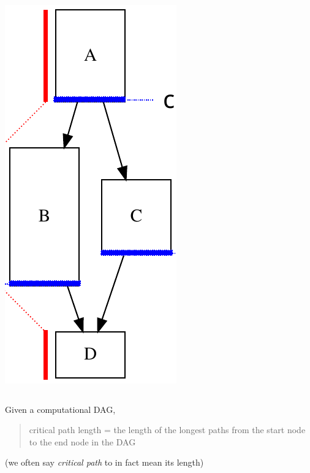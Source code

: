 \documentclass[12pt,dvipdfmx]{beamer}
\newcommand{\ao}[1]{{\color{blue}#1}}
\begin{document}
\begin{frame}[fragile]
\begin{columns}[t]
\begin{column}{0.35\textwidth}
\begin{center}
\includegraphics[width=\textwidth]{out/pdf/svg/dag_cp.pdf}
\end{center}
\end{column}
\end{columns}

Given a computational DAG,
\begin{quote}
\ao{critical path length 
  = the length of the longest 
  paths from the start node to the end node in the DAG}
\end{quote}

(we often say {\em critical path} to in fact mean its length)
\end{frame}
\end{document}
